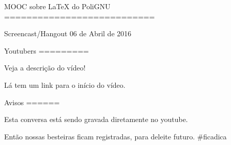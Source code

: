 MOOC sobre LaTeX do PoliGNU
===========================

Screencast/Hangout  06 de Abril de 2016


Youtubers
=========

Veja a descrição do vídeo!

Lá tem um link para o início do vídeo.


Avisos
======

Esta conversa está sendo gravada
diretamente no youtube.

Então nossas besteiras ficam registradas,
para deleite futuro. #ficadica

